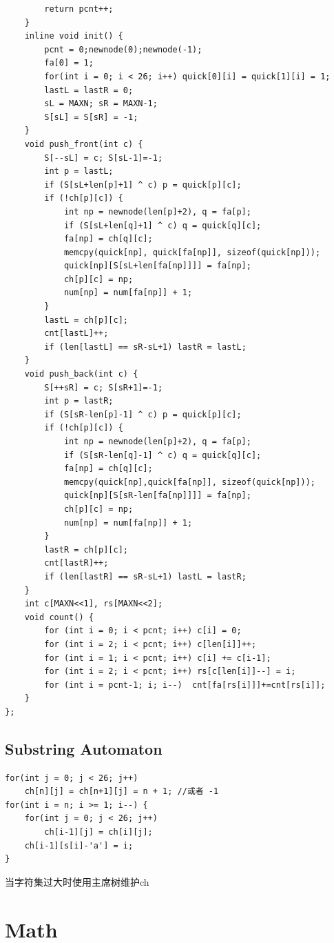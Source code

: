\documentclass[10pt]{ctexart}
\begin{document}
{\begin{lstlisting}
        return pcnt++;
    }
    inline void init() {
        pcnt = 0;newnode(0);newnode(-1);
        fa[0] = 1;
        for(int i = 0; i < 26; i++) quick[0][i] = quick[1][i] = 1;
        lastL = lastR = 0;
        sL = MAXN; sR = MAXN-1;
        S[sL] = S[sR] = -1;
    }
    void push_front(int c) {
        S[--sL] = c; S[sL-1]=-1;
        int p = lastL;
        if (S[sL+len[p]+1] ^ c) p = quick[p][c];
        if (!ch[p][c]) {
            int np = newnode(len[p]+2), q = fa[p];
            if (S[sL+len[q]+1] ^ c) q = quick[q][c];
            fa[np] = ch[q][c];
            memcpy(quick[np], quick[fa[np]], sizeof(quick[np]));
            quick[np][S[sL+len[fa[np]]]] = fa[np];
            ch[p][c] = np;
            num[np] = num[fa[np]] + 1;
        }
        lastL = ch[p][c];
        cnt[lastL]++;
        if (len[lastL] == sR-sL+1) lastR = lastL;
    }
    void push_back(int c) {
        S[++sR] = c; S[sR+1]=-1;
        int p = lastR;
        if (S[sR-len[p]-1] ^ c) p = quick[p][c];
        if (!ch[p][c]) {
            int np = newnode(len[p]+2), q = fa[p];
            if (S[sR-len[q]-1] ^ c) q = quick[q][c];
            fa[np] = ch[q][c];
            memcpy(quick[np],quick[fa[np]], sizeof(quick[np]));
            quick[np][S[sR-len[fa[np]]]] = fa[np];
            ch[p][c] = np;
            num[np] = num[fa[np]] + 1;
        }
        lastR = ch[p][c];
        cnt[lastR]++;
        if (len[lastR] == sR-sL+1) lastL = lastR;
    }
    int c[MAXN<<1], rs[MAXN<<2];
    void count() {
        for (int i = 0; i < pcnt; i++) c[i] = 0;
        for (int i = 2; i < pcnt; i++) c[len[i]]++;
        for (int i = 1; i < pcnt; i++) c[i] += c[i-1];
        for (int i = 2; i < pcnt; i++) rs[c[len[i]]--] = i;
        for (int i = pcnt-1; i; i--)  cnt[fa[rs[i]]]+=cnt[rs[i]];
    }
};
\end{lstlisting}
\subsection{Substring Automaton}
\begin{lstlisting}
for(int j = 0; j < 26; j++) 
	ch[n][j] = ch[n+1][j] = n + 1; //或者 -1
for(int i = n; i >= 1; i--) {
	for(int j = 0; j < 26; j++) 
		ch[i-1][j] = ch[i][j];
	ch[i-1][s[i]-'a'] = i;
}
\end{lstlisting}
当字符集过大时使用主席树维护ch






\newpage
\section{Math}
}
\end{document}
